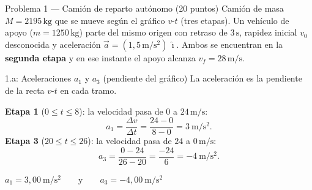 \documentclass[letterpaper, 11pt]{article}
\begin{document}
\newpage

\begin{enunciadobox}{Problema 1 --- Cami\'on de reparto aut\'onomo \hfill (20 puntos)}
Cami\'on de masa $M=2195\,\mathrm{kg}$ que se mueve seg\'un el gr\'afico $v$-$t$
(tres etapas). Un vehículo de apoyo ($m=1250\,\mathrm{kg}$) parte del mismo
origen con retraso de $3\,\mathrm{s}$, rapidez inicial $v_0$ desconocida y
aceleraci\'on $\vec{a}=(1{,}5\,\mathrm{m/s^2})\,\hat{\imath}$. Ambos se encuentran
en la \textbf{segunda etapa} y en ese instante el apoyo alcanza $v_f=28\,\mathrm{m/s}$.
\end{enunciadobox}

\medskip
\begin{center}
\end{center}

\begin{paso}{1.a: Aceleraciones $a_1$ y $a_3$ (pendiente del gr\'afico)}
La aceleraci\'on es la pendiente de la recta $v$-$t$ en cada tramo.

\textbf{Etapa 1} ($0\le t\le 8$): la velocidad pasa de $0$ a $24\,\mathrm{m/s}$:
\[
a_1=\frac{\Delta v}{\Delta t}=\frac{24-0}{8-0}=3\ \mathrm{m/s^2}.
\]
\textbf{Etapa 3} ($20\le t\le 26$): la velocidad pasa de $24$ a $0\,\mathrm{m/s}$:
\[
a_3=\frac{0-24}{26-20}=\frac{-24}{6}=-4\ \mathrm{m/s^2}.
\]
\begin{resultado}\centering
$\displaystyle a_1 = 3{,}00\ \mathrm{m/s^2}\qquad\text{y}\qquad a_3 = -4{,}00\ \mathrm{m/s^2}$
\end{resultado}
\end{paso}
\end{document}

